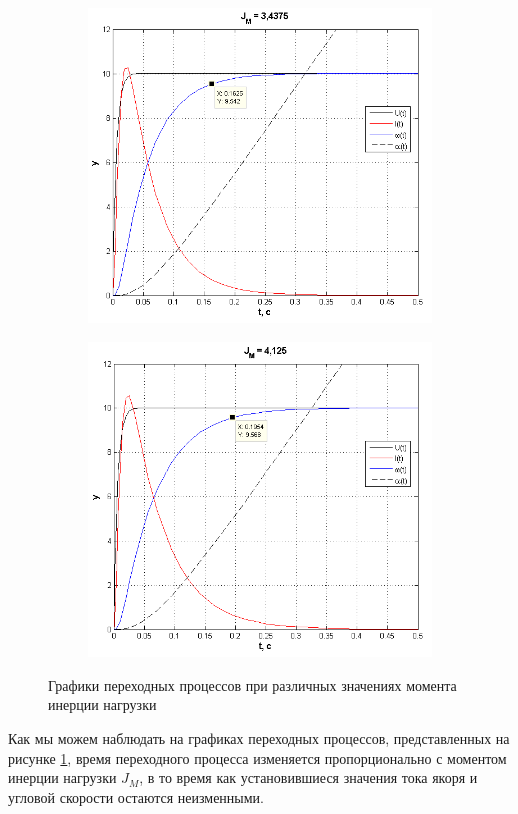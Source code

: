 \documentclass[fleqn, a4paper, 11pt, russian]{article}
\begin{document}
	\begin{figure}[ht!]\ContinuedFloat
		\centering
		\begin{subfigure}[b]{0.48\textwidth}
			\includegraphics[width = \textwidth]{J3}
		\end{subfigure}
		\hfill
		\begin{subfigure}[b]{0.48\textwidth}
			\includegraphics[width = \textwidth]{J4}
		\end{subfigure}
		\caption{Графики переходных процессов при различных значениях момента инерции нагрузки}
		\label{JVar}
	\end{figure}
	Как мы можем наблюдать на графиках переходных процессов, представленных на рисунке \ref{JVar}, время переходного процесса изменяется пропорционально с моментом инерции нагрузки $J_M$, в то время как установившиеся значения тока якоря и угловой скорости остаются неизменными.
	\clearpage
\end{document}
